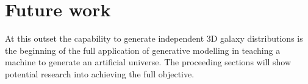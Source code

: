 \documentclass[twocolumn]{article}
\numberwithin{equation}{section}
\begin{document}



\section{Future work}\label{sec:future_work}
At this outset the capability to generate independent 3D galaxy distributions is the beginning of the full application of generative modelling in teaching a machine to generate an artificial universe. The proceeding sections will show potential research into achieving the full objective.
\end{document}
